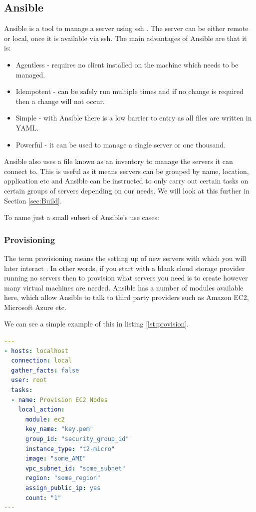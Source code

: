 \documentclass{article}
\begin{document}
\subsection{Ansible}
\label{sub:Ansible}
Ansible is a tool to manage a server using ssh \citep{Ansible2016}. The server can be either remote or local, once it is available via ssh. The main advantages of Ansible are that it is:

\begin{itemize}
  \item Agentless - requires no client installed on the machine which needs to be managed.
  \item Idempotent - can be safely run multiple times and if no change is required then a change will not occur.
  \item Simple - with Ansible there is a low barrier to entry as all files are written in YAML.
  \item Powerful - it can be used to manage a single server or one thousand. 
\end{itemize}

Ansible also uses a file known as an inventory to manage the servers it can connect to. This is useful as it means servers can be grouped by name, location, application etc and Ansible can be instructed to only carry out certain tasks on certain groups of servers depending on our needs. We will look at this further in Section \ref{sec:Build}. 

To name just a small subset of Ansible's use cases:

\subsubsection{Provisioning}
The term provisioning means the setting up of new servers with which you will later interact \citep{Hochstein2015}. In other words, if you start with a blank cloud storage provider running no servers then to provision what servers you need is to create however many virtual machines are needed. Ansible has a number of modules available here, which allow Ansible to talk to third party providers such as Amazon EC2, Microsoft Azure etc. 

We can see a simple example of this in listing \ref{lst:provision}.

\begin{lstlisting}[float,floatplacement=!htbp,language=yaml,caption={Playbook To Create Instances On EC2},label={lst:provision},basicstyle=\scriptsize]
---
- hosts: localhost
  connection: local
  gather_facts: false
  user: root
  tasks:
  - name: Provision EC2 Nodes
    local_action:
      module: ec2
      key_name: "key.pem"
      group_id: "security_group_id"
      instance_type: "t2-micro"
      image: "some_AMI"
      vpc_subnet_id: "some_subnet"
      region: "some_region"
      assign_public_ip: yes
      count: "1"
---
\end{lstlisting}
\end{document}
